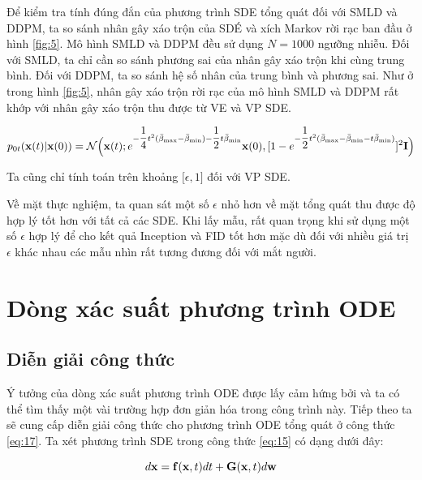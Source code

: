 \documentclass{article} %
\begin{document}
Để kiểm tra tính đúng đắn của phương trình SDE tổng quát đối với SMLD và DDPM, ta so sánh nhân gây xáo trộn của SDÉ và xích Markov rời rạc ban đầu ở hình \ref{fig:5}.
Mô hình SMLD và DDPM đều sử dụng $N=1000$ ngưỡng nhiễu.
Đối với SMLD, ta chỉ cần so sánh phương sai của nhân gây xáo trộn khi cùng trung bình.
Đối với DDPM, ta so sánh hệ số nhân của trung bình và phương sai.
Như ở trong hình \ref{fig:5}, nhân gây xáo trộn rời rạc của mô hình SMLD và DDPM rất khớp với nhân gây xáo trộn thu được từ VE và VP SDE.

\begin{equation}
    p_{0t}(\bold{x}(t) \vert \bold{x}(0)) = \mathcal{N} \Big( \bold{x}(t); e^{-\dfrac{1}{4}t^2 (\bar{\beta}_{\max} - \bar{\beta}_{\min}) - \dfrac{1}{2}t\bar{\beta}_{\min}} \bold{x}(0), \lbrack 1 - e^{-\dfrac{1}{2}t^2 (\bar{\beta}_{\max} - \bar{\beta}_{\min} - t\bar{\beta}_{\min})} \rbrack^2 \bold{I} \Big)
\end{equation}

Ta cũng chỉ tính toán trên khoảng $\lbrack \epsilon, 1 \rbrack$ đối với VP SDE.

Về mặt thực nghiệm, ta quan sát một số $\epsilon$ nhỏ hơn về mặt tổng quát thu được độ hợp lý tốt hơn với tất cả các SDE.
Khi lấy mẫu, rất quan trọng khi sử dụng một số $\epsilon$ hợp lý để cho kết quả Inception và FID tốt hơn mặc dù đối với nhiều giá trị $\epsilon$ khác nhau các mẫu nhìn rất tương đương đối với mắt người. 


\section{Dòng xác suất phương trình ODE} \label{D}

\subsection{Diễn giải công thức} \label{D.1}

Ý tưởng của dòng xác suất phương trình ODE được lấy cảm hứng bởi \citep{maoutsa2020interacting} và ta có thể tìm thấy một vài trường hợp đơn giản hóa trong công trình này.
Tiếp theo ta sẽ cung cấp diễn giải công thức cho phương trình ODE tổng quát ở công thức \ref{eq:17}.
Ta xét phương trình SDE trong công thức \ref{eq:15} có dạng dưới đây:

\begin{equation*}
    d \bold{x} = \bold{f} (\bold{x}, t) dt + \bold{G}(\bold{x}, t) d \bold{w}
\end{equation*}
\end{document}
